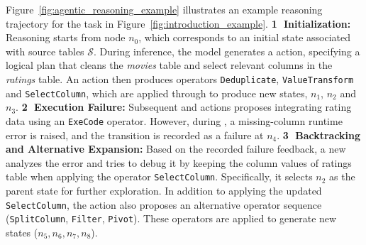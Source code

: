 \begin{example}
\label{exam:agentic_reasoning_example}
Figure~\ref{fig:agentic_reasoning_example} illustrates an example reasoning trajectory for the task in Figure~\ref{fig:introduction_example}.
\textbf{\textcircled{1} Initialization:}
Reasoning starts from node $n_0$, which corresponds to an initial state associated with source tables $\mathcal{S}$.
During inference, the model generates a  action, specifying a logical plan that cleans the \textit{movies} table and select relevant columns in the \textit{ratings} table. An  action then produces operators \texttt{Deduplicate}, \texttt{ValueTransform} and \texttt{SelectColumn}, which are applied through  to produce new states, \ie $n_1$, $n_2$ and $n_3$.
%
\textbf{\textcircled{2} Execution Failure:}
Subsequent  and  actions proposes integrating rating data using an \texttt{ExeCode} operator.
However, during , a missing-column runtime error is raised, and the transition is recorded as a failure at $n_4$.
%
\textbf{\textcircled{3} Backtracking and Alternative Expansion:}
 Based on the recorded failure feedback, a new  analyzes the error and tries to debug it by keeping the column values of ratings table when applying the operator \texttt{SelectColumn}. Specifically, it selects $n_2$ as the parent state for further exploration.
In addition to applying the updated \texttt{SelectColumn}, the  action also proposes an alternative operator sequence (\texttt{SplitColumn}, \texttt{Filter}, \texttt{Pivot}).  These operators are applied to generate new states ($n_5, n_6, n_7,n_8$).

\end{example}
